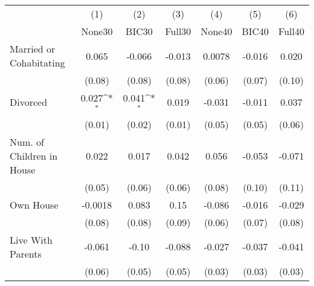 {
\def\sym#1{\ifmmode^{#1}\else\(^{#1}\)\fi}
\begin{tabular}{l*{6}{c}}
\toprule
            &\multicolumn{1}{c}{(1)}&\multicolumn{1}{c}{(2)}&\multicolumn{1}{c}{(3)}&\multicolumn{1}{c}{(4)}&\multicolumn{1}{c}{(5)}&\multicolumn{1}{c}{(6)}\\
            &\multicolumn{1}{c}{None30}&\multicolumn{1}{c}{BIC30}&\multicolumn{1}{c}{Full30}&\multicolumn{1}{c}{None40}&\multicolumn{1}{c}{BIC40}&\multicolumn{1}{c}{Full40}\\
\midrule
Married or Cohabitating&       0.065         &      -0.066         &      -0.013         &      0.0078         &      -0.016         &       0.020         \\
            &      (0.08)         &      (0.08)         &      (0.08)         &      (0.06)         &      (0.07)         &      (0.10)         \\
\addlinespace
Divorced    &       0.027\sym{*}  &       0.041\sym{*}  &       0.019         &      -0.031         &      -0.011         &       0.037         \\
            &      (0.01)         &      (0.02)         &      (0.01)         &      (0.05)         &      (0.05)         &      (0.06)         \\
\addlinespace
Num. of Children in House&       0.022         &       0.017         &       0.042         &       0.056         &      -0.053         &      -0.071         \\
            &      (0.05)         &      (0.06)         &      (0.06)         &      (0.08)         &      (0.10)         &      (0.11)         \\
\addlinespace
Own House   &     -0.0018         &       0.083         &        0.15         &      -0.086         &      -0.016         &      -0.029         \\
            &      (0.08)         &      (0.08)         &      (0.09)         &      (0.06)         &      (0.07)         &      (0.08)         \\
\addlinespace
Live With Parents&      -0.061         &       -0.10         &      -0.088         &      -0.027         &      -0.037         &      -0.041         \\
            &      (0.06)         &      (0.05)         &      (0.05)         &      (0.03)         &      (0.03)         &      (0.03)         \\
\bottomrule
\end{tabular}
}
